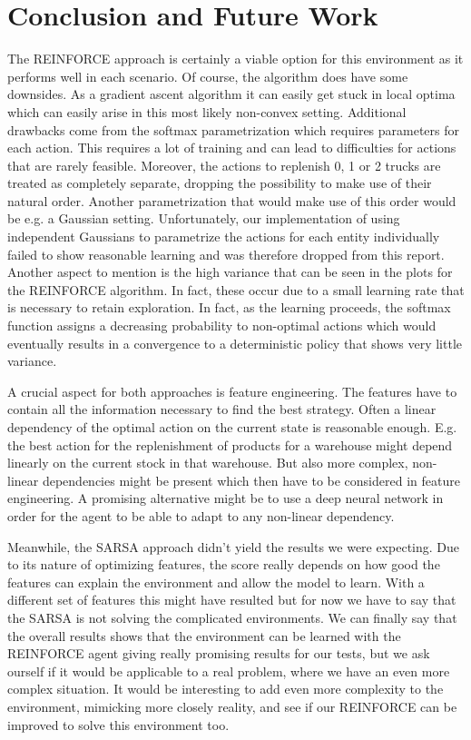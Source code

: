 \documentclass[journal, a4paper]{IEEEtran}
\theoremstyle{plain}
\theoremstyle{definition}
\begin{document}
\section{Conclusion and Future Work}
The REINFORCE approach is certainly a viable option for this environment as it performs well in each scenario. Of course, the algorithm does have some downsides. As a gradient ascent algorithm it can easily get stuck in local optima which can easily arise in this most likely non-convex setting. 
Additional drawbacks come from the softmax parametrization which 
requires parameters for each action. This requires a lot of training and can lead to difficulties for actions that are rarely feasible. Moreover, the actions to replenish 0, 1 or 2 trucks are treated as completely separate, dropping the possibility to make use of their natural order. Another parametrization that would make use of this order would be e.g. a Gaussian setting. 
Unfortunately, our implementation of using independent Gaussians to parametrize the actions for each entity individually failed to show reasonable learning and was therefore dropped from this report.
Another aspect to mention is the high variance that can be seen in the plots for the REINFORCE algorithm. In fact, these occur due to a small learning rate that is necessary to retain exploration. In fact, as the learning proceeds, the softmax function assigns a decreasing probability to non-optimal actions which would eventually results in a convergence to a deterministic policy that shows very little variance. 

A crucial aspect for both approaches is feature engineering. The features have to contain all the information necessary to find the best strategy. Often a linear dependency of the optimal action on the current state is reasonable enough. E.g. the best action for the replenishment of products for a warehouse might depend linearly on the current stock in that warehouse. But also more complex, non-linear dependencies might be present which then have to be considered in feature engineering. A promising alternative might be to use a deep neural network in order for the agent to be able to adapt to any non-linear dependency. 



Meanwhile, the SARSA approach didn't yield the results we were expecting. Due to its nature of optimizing features, the score really depends on how good the features can explain the environment and allow the model to learn. With a different set of features this might have resulted but for now we have to say that the SARSA is not solving the complicated environments. 
We can finally say that the overall results shows that the environment can be learned with the REINFORCE agent giving really promising results for our tests, but we ask ourself if it would be applicable to a real problem, where we have an even more complex situation. It would be interesting to add even more complexity to the environment, mimicking more closely reality, and see if our REINFORCE can be improved to solve this environment too. 
\end{document}
